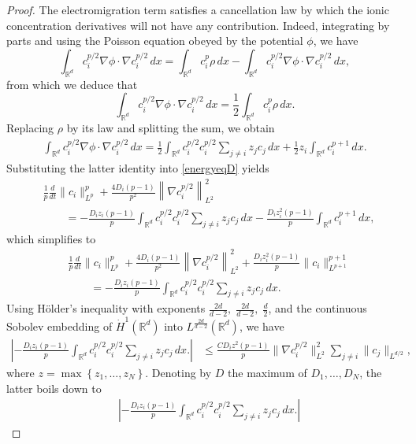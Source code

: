 \documentclass[11pt,reqno]{amsart}
\newcommand{\be}{\begin{equation}}
\newcommand{\ee}{\end{equation}}
\begin{document}
\begin{proof}
The electromigration term satisfies a cancellation law by which the ionic concentration derivatives will not have any contribution. Indeed, integrating by parts and using the Poisson equation obeyed by the potential $\phi$, we have
\be
\int_{\mathbb{R}^d} c_i^{p/2} \nabla\phi\cdot \nabla c_i^{p/2}\,dx = \int_{\mathbb{R}^d} c_i^{p} \rho\,dx - \int_{\mathbb{R}^d} c_i^{p/2} \nabla\phi\cdot \nabla c_i^{p/2}\,dx,
\ee from which we deduce that 
\be
\int_{\mathbb{R}^d} c_i^{p/2} \nabla\phi\cdot \nabla c_i^{p/2}\,dx =\frac{1}{2}\int_{\mathbb{R}^d} c_i^{p} \rho\,dx.
\ee
Replacing $\rho$ by its law and splitting the sum, we obtain
\begin{align}
\int_{\mathbb{R}^d} c_i^{p/2} \nabla\phi\cdot \nabla c_i^{p/2}\,dx =\frac{1}{2}\int_{\mathbb{R}^d} c_i^{p/2}c_i^{p/2} \sum_{j\neq i}z_jc_j\,dx + \frac{1}{2}z_i\int_{\mathbb{R}^d}c_i^{p+1}\,dx.
\end{align}
Substituting the latter identity into \eqref{energyeqD} yields 
\begin{align}
&\frac{1}{p} \frac{d}{dt} \|c_i\|_{L^p}^p + \frac{4D_i(p-1)}{p^2} \left\| \nabla c_i^{p/2} \right\|_{L^2}^2 
\\&\quad\quad= -\frac{D_i z_i(p-1)}{p}\int_{\mathbb{R}^d} c_i^{p/2}c_i^{p/2} \sum_{j\neq i}z_jc_j\,dx -\frac{D_i z_i^2(p-1)}{p}\int_{\mathbb{R}^d}c_i^{p+1}\,dx,
\end{align}
which simplifies to 
\begin{align}\label{energyD}
&\frac{1}{p} \frac{d}{dt} \|c_i\|_{L^p}^p + \frac{4D_i(p-1)}{p^2} \left\| \nabla c_i^{p/2} \right\|_{L^2}^2 + \frac{D_i z_i^2(p-1)}{p}\|c_i\|_{L^{p+1}}^{p+1} \\&\quad\quad= -\frac{D_i z_i(p-1)}{p}\int_{\mathbb{R}^d} c_i^{p/2}c_i^{p/2} \sum_{j\neq i}z_jc_j\,dx.
\end{align}
Using Hölder's inequality with exponents
$
\frac{2d}{d-2},\;\frac{2d}{d-2},\;\frac{d}{2}$, and
the continuous Sobolev embedding of $
\dot{H}^1(\mathbb{R}^d)$ into $L^\frac{2d}{d-2}(\mathbb{R}^d)$, we have
\begin{align}\label{rhsD2}
\left| -\frac{D_i z_i(p-1)}{p}\int_{\mathbb{R}^d} c_i^{p/2}c_i^{p/2}\sum_{j\neq i} z_jc_j\,dx. \right|
&\leq \frac{CD_i z^2(p-1)}{p} \|\nabla c_i^{p/2}\|^2_{L^2}\sum_{j\neq i}\|c_j\|_{L^{d/2}},
\end{align} where $z = \max \left\{z_1, \dots, z_N\right\}.$ Denoting by $D$ the maximum of $D_1, \dots, D_N$, the latter boils down to 
\begin{align}
&\left| -\frac{D_i z_i(p-1)}{p}\int_{\mathbb{R}^d} c_i^{p/2}c_i^{p/2}\sum_{j\neq i} z_jc_j\,dx. \right|

\end{align}
\end{proof}
\end{document}
